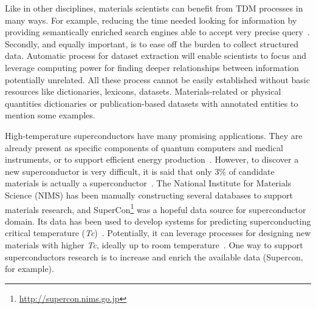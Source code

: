 \documentclass[a4paper,10pt]{article}
\begin{document}
Like in other disciplines, materials scientists can benefit from TDM processes in many ways. 
For example, reducing the time needed looking for information by providing semantically enriched search engines able to accept very precise query~\cite{Liu2019SurfaceMR}. 
Secondly, and equally important, is to ease off the burden to collect structured data. Automatic process for dataset extraction will enable scientists to focus and leverage computing power for finding deeper relationships between information potentially unrelated.
All these process cannot be easily established without basic resources like dictionaries, lexicons, datasets. Materials-related or physical quantities dictionaries or publication-based datasets with annotated entities to mention some examples. 



High-temperature superconductors have many promising applications. They are already present as specific components of quantum computers and medical instruments, or to support efficient energy production~\cite{Hoshino2015InnovativeLR, Kizu2010ConstructionOT, Cardani2017NewAO}. 
However, to discover a new superconductor is very difficult, it is said that only 3\% of candidate materials is actually a superconductor~\cite{Konno2018DeepLO}.
The National Institute for Materials Science (NIMS) has been manually constructing several databases to support materials research, and SuperCon\footnote{\url{http://supercon.nims.go.jp}} was a hopeful data source for superconductor domain. 
Its data has been used to develop systems for predicting superconducting critical temperature (\textit{Tc})~\cite{stanev2017machine}. Potentially, it can leverage processes for designing new materials with higher \textit{Tc}, ideally up to room temperature~\cite{Hamlin2019SuperconductivityNR}. One way to support superconductors research is to increase and enrich the available data (Supercon, for example).
\end{document}

